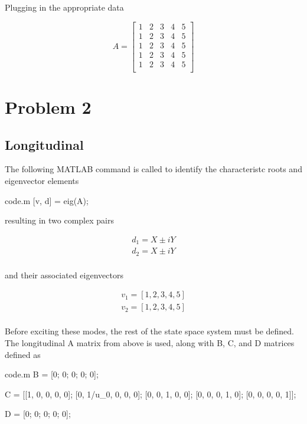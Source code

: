 \documentclass[12pt]{article}
\begin{document}
\noindent Plugging in the appropriate data

\begin{equation*}
A =
\begin{bmatrix}
    1 & 2 & 3 & 4 & 5 \\
    1 & 2 & 3 & 4 & 5 \\
    1 & 2 & 3 & 4 & 5 \\
    1 & 2 & 3 & 4 & 5 \\
    1 & 2 & 3 & 4 & 5 \\
\end{bmatrix}
\end{equation*}

\newpage
\section{Problem 2}
\subsection{Longitudinal}
\noindent The following MATLAB command is called to identify the characteristc roots and eigenvector elements
\begin{filecontents*}{code.m}
[v, d] = eig(A);
\end{filecontents*}


\noindent resulting in two complex pairs

\begin{equation*}
\begin{split}
d_1 = X \pm i Y \\
d_2 = X \pm i Y \\
\end{split}
\end{equation*}

\noindent and their associated eigenvectors

\begin{equation*}
\begin{split}
v_1 = [1, 2, 3, 4, 5] \\
v_2 = [1, 2, 3, 4, 5] \\
\end{split}
\end{equation*}

\noindent Before exciting these modes, the rest of the state space system must be defined. The longitudinal A matrix from above is used, along with B, C, and D matrices defined as
\begin{filecontents*}{code.m}
B = [0; 0; 0; 0; 0];

C = [[1, 0, 0, 0, 0];
     [0, 1/u_0, 0, 0, 0];
     [0, 0, 1, 0, 0];
     [0, 0, 0, 1, 0];
     [0, 0, 0, 0, 1]];

D = [0; 0; 0; 0; 0];
\end{filecontents*}

\end{document}
